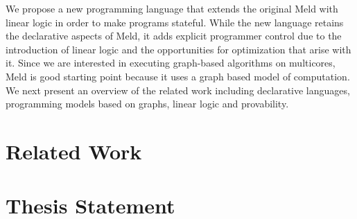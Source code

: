 We propose a new programming language that extends the original Meld with linear logic in
order to make programs stateful. While the new language retains
the declarative aspects of Meld, it adds explicit programmer control
due to the introduction of linear logic and the opportunities for optimization that arise with it.
Since we are interested in executing graph-based algorithms on multicores, Meld is good starting
point because it uses a graph based model of computation. 
We next present an overview of the related work including declarative languages, programming models
based on graphs, linear logic and provability.

\section{Related Work}



\section{Thesis Statement}


